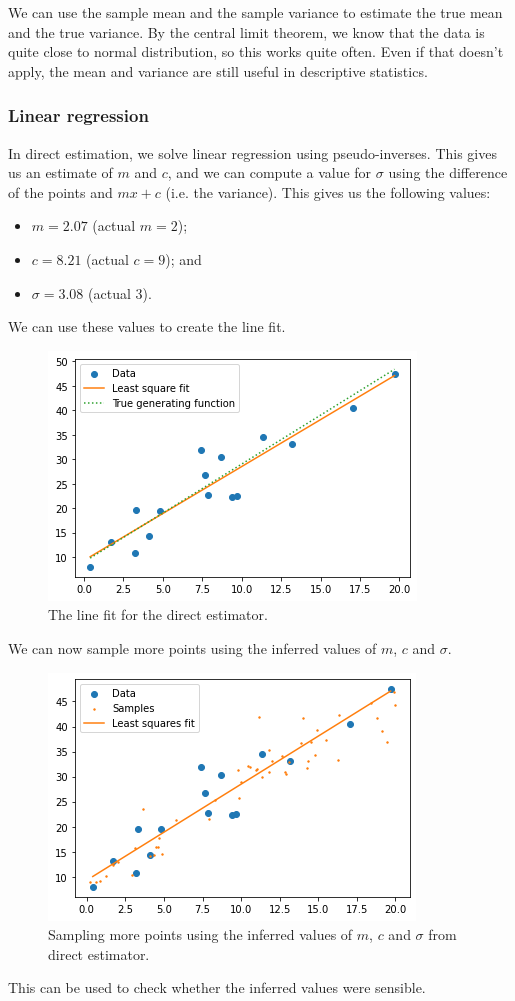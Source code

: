 \documentclass[a4paper, openany]{memoir}
\begin{document}
We can use the sample mean and the sample variance to estimate the true mean and the true variance. By the central limit theorem, we know that the data is quite close to normal distribution, so this works quite often. Even if that doesn't apply, the mean and variance are still useful in descriptive statistics.

\subsubsection{Linear regression}
In direct estimation, we solve linear regression using pseudo-inverses. This gives us an estimate of $m$ and $c$, and we can compute a value for $\sigma$ using the difference of the points and $mx + c$ (i.e. the variance). This gives us the following values:
\begin{itemize}
    \item $m = 2.07$ (actual $m = 2$);
    \item $c = 8.21$ (actual $c = 9$); and
    \item $\sigma = 3.08$ (actual $3$).
\end{itemize}
We can use these values to create the line fit.
\begin{figure}[H]
    \centering
    \includegraphics[scale=0.7]{src/5.26 linefit directestimation.png}
    \caption{The line fit for the direct estimator.}
\end{figure}
\noindent We can now sample more points using the inferred values of $m$, $c$ and $\sigma$.
\begin{figure}[H]
    \centering
    \includegraphics[scale=0.7]{src/5.27 sampling more from direct estimation.png}
    \caption{Sampling more points using the inferred values of $m$, $c$ and $\sigma$ from direct estimator.}
\end{figure}
\noindent This can be used to check whether the inferred values were sensible.
\end{document}
